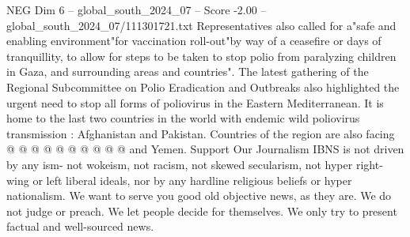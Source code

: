 \begin{textsample}{NEG Dim 6 – global\_south\_2024\_07 – Score -2.00 – global\_south\_2024\_07/111301721.txt}
Representatives also called for a"safe and enabling environment"for vaccination roll-out"by way of a ceasefire or days of tranquillity, to allow for steps to be taken to stop polio from paralyzing children in Gaza, and surrounding areas and countries".
The latest gathering of the Regional Subcommittee on Polio Eradication and Outbreaks also highlighted the urgent need to stop all forms of poliovirus in the Eastern Mediterranean.
It is home to the last two countries in the world with endemic wild poliovirus transmission : Afghanistan and Pakistan.
Countries of the region are also facing @ @ @ @ @ @ @ @ @ @ and Yemen.
Support Our Journalism IBNS is not driven by any ism- not wokeism, not racism, not skewed secularism, not hyper right-wing or left liberal ideals, nor by any hardline religious beliefs or hyper nationalism.
We want to serve you good old objective news, as they are.
We do not judge or preach.
We let people decide for themselves.
We only try to present factual and well-sourced news.

\end{textsample}
